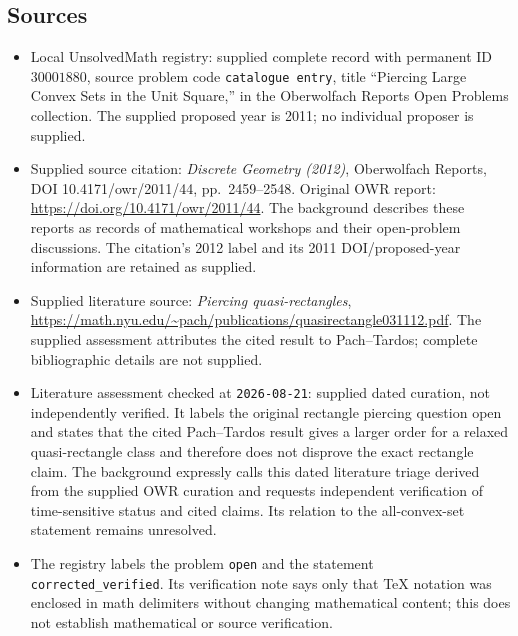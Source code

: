 \documentclass[11pt]{article}
\begin{document}
\subsection{Sources}
\begin{itemize}
\item Local UnsolvedMath registry: supplied complete record with permanent ID \(30001880\), source problem code \texttt{catalogue entry}, title ``Piercing Large Convex Sets in the Unit Square,'' in the Oberwolfach Reports Open Problems collection. The supplied proposed year is 2011; no individual proposer is supplied.
\item Supplied source citation: \emph{Discrete Geometry (2012)}, Oberwolfach Reports, DOI 10.4171/owr/2011/44, pp.~2459--2548. Original OWR report: \url{https://doi.org/10.4171/owr/2011/44}. The background describes these reports as records of mathematical workshops and their open-problem discussions. The citation's 2012 label and its 2011 DOI/proposed-year information are retained as supplied.
\item Supplied literature source: \emph{Piercing quasi-rectangles}, \url{https://math.nyu.edu/~pach/publications/quasirectangle031112.pdf}. The supplied assessment attributes the cited result to Pach--Tardos; complete bibliographic details are not supplied.
\item Literature assessment checked at \texttt{2026-08-21}: supplied dated curation, not independently verified. It labels the original rectangle piercing question open and states that the cited Pach--Tardos result gives a larger order for a relaxed quasi-rectangle class and therefore does not disprove the exact rectangle claim. The background expressly calls this dated literature triage derived from the supplied OWR curation and requests independent verification of time-sensitive status and cited claims. Its relation to the all-convex-set statement remains unresolved.
\item The registry labels the problem \texttt{open} and the statement \texttt{corrected\_verified}. Its verification note says only that TeX notation was enclosed in math delimiters without changing mathematical content; this does not establish mathematical or source verification.
\end{itemize}
\end{document}
